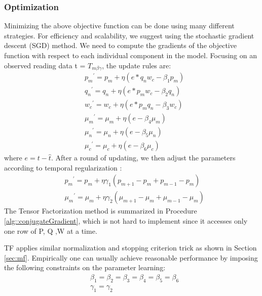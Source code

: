 \subsubsection{Optimization}
Minimizing the above objective function can be done using many different strategies.
For efficiency and scalability, we suggest using the stochastic gradient descent (SGD) method.
We need to compute the gradients of the objective function with respect to each individual component in the model.
Focusing on an observed reading data t = $T_{m\beta\gamma } $, the update rules are:
\begin{equation*}
\begin{aligned}
&{p_m}^\prime={p_m}+\eta(e*q_n w_c - \beta_1 p_m)
\\&{q_n}^\prime={q_n}+\eta(e*p_m w_c - \beta_2 q_n)
\\&{w_c}^\prime={w_c}+\eta(e*p_m q_n - \beta_3 w_c)
\\&{\mu_m}^\prime=\mu_m+\eta(e-\beta_4\mu_m)
\\&{\mu_n}^\prime=\mu_n+\eta(e-\beta_5\mu_n)
\\&{\mu_c}^\prime=\mu_c+\eta(e-\beta_6\mu_c)
\end{aligned}
\end{equation*}
where $e=t-\hat{t}$. After a round of updating, we then adjust the parameters according to temporal regularization :
\begin{equation*}
\begin{aligned}
&{p_m}^\prime={p_m}+\eta\gamma_1(p_{m+1}-p_m+p_{m-1}-p_m)
\\&{\mu_m}^\prime=\mu_m+\eta\gamma_2(\mu_{m+1}-\mu_m+\mu_{m-1}-\mu_m)
\end{aligned}
\end{equation*}
The Tensor Factorization method is summarized in Procedure \ref{alg::conjugateGradient}, which is not hard to implement since it accesses only one row of P, Q ,W at a time.

TF applies similar normalization and stopping criterion trick as shown in Section \ref{sec:mf}.
Empirically one can usually achieve reasonable performance by imposing the following constraints on the parameter learning:  
\begin{equation*}
\begin{aligned}
& \beta_1=\beta_2=\beta_3=\beta_4=\beta_5=\beta_6\\
&\gamma_1=\gamma_2\\
\end{aligned}
\end{equation*}
